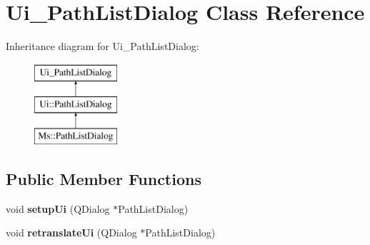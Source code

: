 \hypertarget{class_ui___path_list_dialog}{}\section{Ui\+\_\+\+Path\+List\+Dialog Class Reference}
\label{class_ui___path_list_dialog}
Inheritance diagram for Ui\+\_\+\+Path\+List\+Dialog\+:\begin{figure}[H]
\begin{center}
\leavevmode
\includegraphics[height=3.000000cm]{class_ui___path_list_dialog}
\end{center}
\end{figure}
\subsection*{Public Member Functions}
\begin{DoxyCompactItemize}
\item 
\mbox{\label{class_ui___path_list_dialog_a6f8bce0c8d68beb7bc1487472b3b70df}} 
void {\bfseries setup\+Ui} (Q\+Dialog $\ast$Path\+List\+Dialog)
\item 
\mbox{\label{class_ui___path_list_dialog_a8c3b6e589bfe53dcce11658da2b738ea}} 
void {\bfseries retranslate\+Ui} (Q\+Dialog $\ast$Path\+List\+Dialog)
\end{DoxyCompactItemize}
